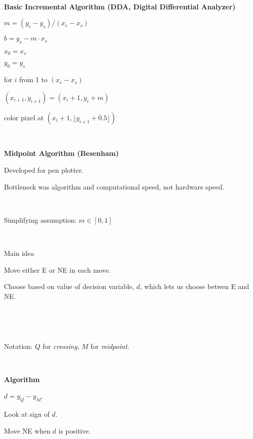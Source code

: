 \documentclass[12pt]{article}
\begin{document}
\begin{spacing}{1.2}
\

{\bf Basic Incremental Algorithm (DDA, Digital Differential Analyzer)}

$m = (y_e - y_s) / (x_e - x_s)$

$b = y_s - m \cdot x_s$

$x_0 = x_s$

$y_0 = y_s$

for $i$ from 1 to $(x_e - x_s)$

\qquad $(x_{i+1}, y_{i+1}) = (x_i + 1, y_i + m)$

\qquad color pixel at $(x_i+1, \lfloor y_{i+1} + 0.5 \rfloor )$ 

\

{\bf Midpoint Algorithm (Besenham)}

Developed for pen plotter.

Bottleneck was algorithm and computational speed, not hardware speed.

\

Simplifying assumption:  $m \in [0,1]$

\

Main idea

\qquad Move either E or NE in each move.  

\qquad Choose based on value of decision variable, $d$, which lets us choose betwen E and NE.  

\

\

\hfil{}

Notation:   $Q$ for {\it crossing}, $M$ for {\it midpoint}.

\

{\bf Algorithm}

$d = y_Q - y_M$.  

Look at sign of $d$.  

Move NE when $d$ is positive.


\end{spacing}
\end{document}
